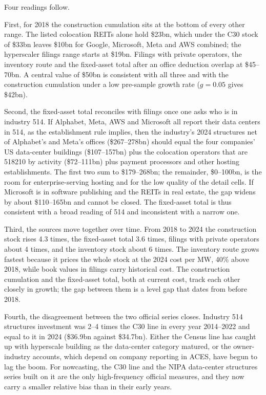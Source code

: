 \documentclass[11pt]{article}
\begin{document}
Four readings follow.

First, for 2018 the construction cumulation sits at the bottom of every other range. The listed colocation REITs alone hold \$23bn, which under the C30 stock of \$33bn leaves \$10bn for Google, Microsoft, Meta and AWS combined; the hyperscaler filings range starts at \$19bn. Filings with private operators, the inventory route and the fixed-asset total after an office deduction overlap at \$45--70bn. A central value of \$50bn is consistent with all three and with the construction cumulation under a low pre-sample growth rate ($g=0.05$ gives \$42bn).

Second, the fixed-asset total reconciles with filings once one asks who is in industry 514. If Alphabet, Meta, AWS and Microsoft all report their data centers in 514, as the establishment rule implies, then the industry's 2024 structures net of Alphabet's and Meta's offices (\$267--278bn) should equal the four companies' US data-center buildings (\$107--157bn) plus the colocation operators that are 518210 by activity (\$72--111bn) plus payment processors and other hosting establishments. The first two sum to \$179--268bn; the remainder, \$0--100bn, is the room for enterprise-serving hosting and for the low quality of the detail cells. If Microsoft is in software publishing and the REITs in real estate, the gap widens by about \$110--165bn and cannot be closed. The fixed-asset total is thus consistent with a broad reading of 514 and inconsistent with a narrow one.

Third, the sources move together over time. From 2018 to 2024 the construction stock rises 4.3 times, the fixed-asset total 3.6 times, filings with private operators about 4 times, and the inventory stock about 6 times. The inventory route grows fastest because it prices the whole stock at the 2024 cost per MW, 40\% above 2018, while book values in filings carry historical cost. The construction cumulation and the fixed-asset total, both at current cost, track each other closely in growth; the gap between them is a level gap that dates from before 2018.

Fourth, the disagreement between the two official series closes. Industry 514 structures investment was 2--4 times the C30 line in every year 2014--2022 and equal to it in 2024 (\$36.9bn against \$34.7bn). Either the Census line has caught up with hyperscale building as the data-center category matured, or the owner-industry accounts, which depend on company reporting in ACES, have begun to lag the boom. For nowcasting, the C30 line and the NIPA data-center structures series built on it are the only high-frequency official measures, and they now carry a smaller relative bias than in their early years.
\end{document}
